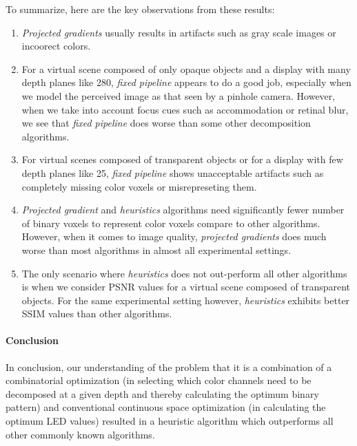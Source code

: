 To summarize, here are the key observations from these results:
\begin{enumerate}
    \item \emph{Projected gradients} usually results in artifacts such as gray scale images or incoorect colors. 
    \item For a virtual scene composed of only opaque objects and a display with many depth planes like 280, \emph{fixed pipeline} appears to do a good job, especially when we model the perceived image as that seen by a pinhole camera. However, when we take into account focus cues such as accommodation or retinal blur, we see that \emph{fixed pipeline} does worse than some other decomposition algorithms. 
    \item For virtual scenes composed of transparent objects or for a display with few depth planes like 25, \emph{fixed pipeline} shows unacceptable artifacts such as completely missing color voxels or misrepreseting them. 
    \item \emph{Projected gradient} and \emph{heuristics} algorithms need significantly fewer number of binary voxels to represent color voxels compare to other algorithms. However, when it comes to image quality, \emph{projected gradients} does much worse than most algorithms in almost all experimental settings.
    \item The only scenario where \emph{heuristics} does not out-perform all other algorithms is when we consider PSNR values for a virtual scene composed of transparent objects. For the same experimental setting however, \emph{heuristics} exhibits better SSIM values than other algorithms.
\end{enumerate}

\paragraph{Conclusion}
In conclusion, our understanding of the problem that it is a combination of a combinatorial optimization (in selecting which color channels need to be decomposed at a given depth and thereby calculating the optimum binary pattern) and conventional continuous space optimization (in calculating the optimum LED values) resulted in a heuristic algorithm which outperforms all other commonly known algorithms.

